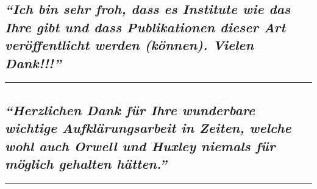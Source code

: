 \hypertarget{ich-bin-sehr-froh-dass-es-institute-wie-das-ihre-gibt-und-dass-publikationen-dieser-art-veruxf6ffentlicht-werden-kuxf6nnen-vielen-dank}{%
\subsection{\texorpdfstring{\emph{``Ich bin sehr froh, dass es Institute
wie das Ihre gibt und dass Publikationen dieser Art veröffentlicht
werden (können). Vielen
Dank!!!''}}{``Ich bin sehr froh, dass es Institute wie das Ihre gibt und dass Publikationen dieser Art veröffentlicht werden (können). Vielen Dank!!!''}}\label{ich-bin-sehr-froh-dass-es-institute-wie-das-ihre-gibt-und-dass-publikationen-dieser-art-veruxf6ffentlicht-werden-kuxf6nnen-vielen-dank}}

\begin{center}\rule{0.5\linewidth}{\linethickness}\end{center}

\hypertarget{herzlichen-dank-fuxfcr-ihre-wunderbare-wichtige-aufkluxe4rungsarbeit-in-zeiten-welche-wohl-auch-orwell-und-huxley-niemals-fuxfcr-muxf6glich-gehalten-huxe4tten}{%
\subsection{\texorpdfstring{\emph{``Herzlichen Dank für Ihre wunderbare
wichtige Aufklärungsarbeit in Zeiten, welche wohl auch Orwell und Huxley
niemals für möglich gehalten
hätten.''}}{``Herzlichen Dank für Ihre wunderbare wichtige Aufklärungsarbeit in Zeiten, welche wohl auch Orwell und Huxley niemals für möglich gehalten hätten.''}}\label{herzlichen-dank-fuxfcr-ihre-wunderbare-wichtige-aufkluxe4rungsarbeit-in-zeiten-welche-wohl-auch-orwell-und-huxley-niemals-fuxfcr-muxf6glich-gehalten-huxe4tten}}

\begin{center}\rule{0.5\linewidth}{\linethickness}\end{center}

